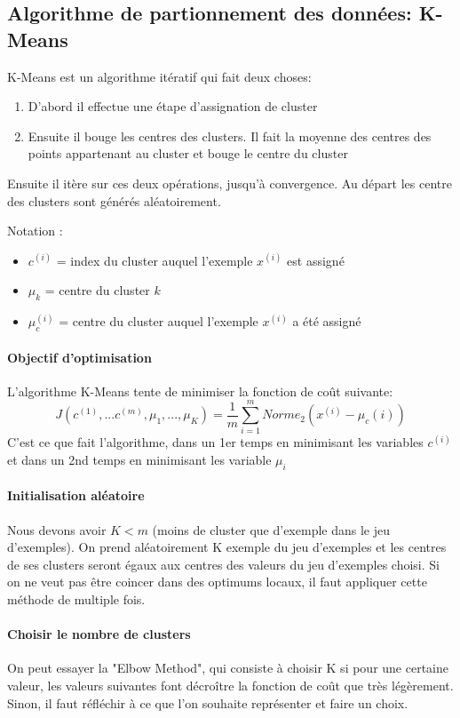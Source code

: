 \documentclass{article}
\theoremstyle{definition}
\begin{document}
\subsection{Algorithme de partionnement des données: K-Means}
K-Means est un algorithme itératif qui fait deux choses:
\begin{enumerate}
\item D'abord il effectue une étape d'assignation de cluster
\item Ensuite il bouge les centres des clusters. Il fait la moyenne des centres des points appartenant au cluster et bouge le centre du cluster
\end{enumerate}
Ensuite il itère sur ces deux opérations, jusqu'à convergence.
Au départ les centre des clusters sont générés aléatoirement.\par
Notation :
\begin{itemize}
\item $c^{(i)}$ = index du cluster auquel l'exemple $x^{(i)}$ est assigné
\item $\mu_k$ = centre du cluster $k$
\item $\mu_c^{(i)}$ = centre du cluster auquel l'exemple $x^{(i)}$ a été assigné
\end{itemize}
\paragraph{Objectif d'optimisation} L'algorithme K-Means tente de minimiser la fonction de coût suivante:
$$J(c^{(1)},...c^{(m)},\mu_1,...,\mu_K) = \frac{1}{m}\sum_{i=1}^{m}Norme_2(x^{(i)}-\mu_c(i))$$
C'est ce que fait l'algorithme, dans un 1er temps en minimisant les variables $c^{(i)}$ et dans un 2nd temps en minimisant les variable $\mu_i$
\paragraph{Initialisation aléatoire} Nous devons avoir $K < m$ (moins de cluster que d'exemple dans le jeu d'exemples). On prend aléatoirement K exemple du jeu d'exemples et les centres de ses clusters seront égaux aux centres des valeurs du jeu d'exemples choisi. Si on ne veut pas être coincer dans des optimums locaux, il faut appliquer cette méthode de multiple fois.
\paragraph{Choisir le nombre de clusters} On peut essayer la "Elbow Method", qui consiste à choisir K si pour une certaine valeur, les valeurs suivantes font décroître la fonction de coût que très légèrement. Sinon, il faut réfléchir à ce que l'on souhaite représenter et faire un choix.\par
\end{document}
